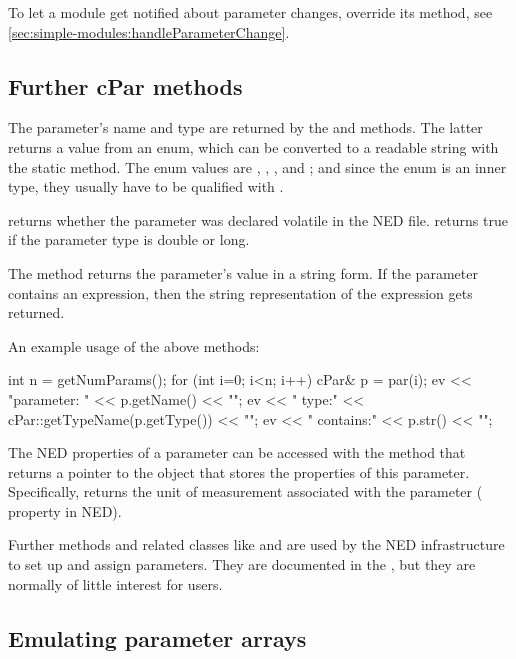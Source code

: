 To let a module get notified about parameter changes, override
its  method, see
\ref{sec:simple-modules:handleParameterChange}.


\subsection{Further cPar methods}

The parameter's name and type are returned by the  and
 methods. The latter returns a value from an enum,
which can be converted to a readable string with the 
static method. The enum values are , , ,
 and ; and since the enum is an inner type,
they usually have to be qualified with .

 returns whether the parameter was declared volatile
in the NED file.  returns true if the parameter
type is double or long.

The  method returns the parameter's value in a string form.
If the parameter contains an expression, then the string representation
of the expression gets returned.

An example usage of the above methods:

\begin{cpp}
int n = getNumParams();
for (int i=0; i<n; i++)
{
    cPar& p = par(i);
    ev << "parameter: " << p.getName() << "\n";
    ev << "  type:" << cPar::getTypeName(p.getType()) << "\n";
    ev << "  contains:" << p.str() << "\n";
}
\end{cpp}

The NED properties of a parameter can be accessed with the 
method that returns a pointer to the  object that stores
the properties of this parameter. Specifically,  returns
the unit of measurement associated with the parameter ( property in NED).

Further  methods and related classes like  and
 are used by the NED infrastructure to set up and
assign parameters. They are documented in the , but
they are normally of little interest for users.


\subsection{Emulating parameter arrays}

